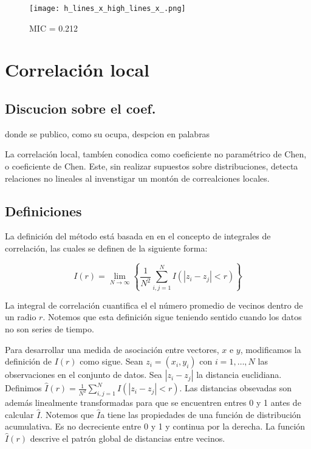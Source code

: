		\begin{figure}[H]
		\centering
		\texttt{[image: h\_lines\_x\_high\_lines\_x\_.png]}
		\caption{ MIC = 0.212}
		\end{figure}

		
\section[]{Correlaci\'on local} 


	\subsection{Discucion sobre el coef.}

	donde se publico, como su ocupa, despcion en palabras

	La correlaci\'on local, tamb\'ien conodica como coeficiente no param\'etrico de Chen, o coeficiente de Chen. Este, sin realizar supuestos sobre distribuciones, detecta relaciones no lineales al invenstigar un mont\'on de correalciones locales. 

	\subsection{Definiciones}

	La definici\'on del m\'etodo est\'a basada en en el concepto de integrales de correlaci\'on, las cuales se definen de la siguiente forma:
	\begin{defn}
		$$
		I(r)=\lim _{N \rightarrow \infty}\left\{\frac{1}{N^{2}} \sum_{i, j=1}^{N} I\left(\left|z_{i}-z_{j}\right|<r\right)\right\}
		$$
	\end{defn}
	La integral de correlaci\'on cuantifica el el n\'umero promedio de vecinos dentro de un radio $r$. Notemos que esta definici\'on sigue teniendo sentido cuando los datos no son series de tiempo.

	Para desarrollar una medida de asociaci\'on entre vectores, $x$ e $y$, modificamos la definici\'on de $I(r)$ como sigue. Sean $z_i=(x_i,y_i)$ con $i=1,\dots, N$ las observaciones en el conjunto de datos. Sea $|z_i-z_j|$ la distancia euclidiana. Definimos $\hat{I}(r)=\frac{1}{N^{2}} \sum_{i, j=1}^{N} I\left(\left|z_{i}-z_{j}\right|<r\right)$. Las distancias obsevadas son adem\'as linealmente transformadas para que se encuentren entres 0 y 1 antes de calcular $\hat{I}$. Notemos que $\hat{I}$a tiene las propiedades de una funci\'on de distribuci\'on acumulativa. Es no decreciente entre 0 y 1 y continua por la derecha. La funci\'on $\hat{I}(r)$ descrive el patr\'on global de distancias entre vecinos. 

